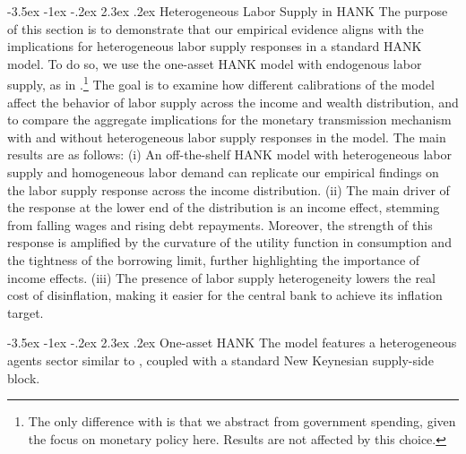 \documentclass[a4paper,12pt]{article}%
\makeatletter
\renewcommand\subsection{\@startsection {subsection}{2}{\z@}%
                  {-3.5ex \@plus -1ex \@minus -.2ex}%
                  {2.3ex \@plus.2ex}%
                  {\centering\normalsize\scshape\color{black}}}
\renewcommand\subsubsection{\@startsection {subsubsection}{3}{\z@}%
                  {-3.5ex \@plus -1ex \@minus -.2ex}%
                  {2.3ex \@plus.2ex}%
                  {\centering\normalsize \bfseries\color{black}}}
\makeatother
\begin{document}
\subsection{Heterogeneous Labor Supply in HANK}\label{T:HANK}
The purpose of this section is to demonstrate that our empirical evidence aligns with the implications for heterogeneous labor supply responses in a standard HANK model. To do so, we use the one-asset HANK model with endogenous labor supply, as in \cite{ABRS21}.\footnote{The only difference with \cite{ABRS21} is that we abstract from government spending, given the focus on monetary policy here. Results are not affected by this choice.} The goal is to examine how different calibrations of the model affect the behavior of labor supply across the income and wealth distribution, and to compare the aggregate implications for the monetary transmission mechanism with and without heterogeneous labor supply responses in the model.
The main results are as follows:
(i) An off-the-shelf HANK model with heterogeneous labor supply and homogeneous labor demand can replicate our empirical findings on the labor supply response across the income distribution.
(ii) The main driver of the response at the lower end of the distribution is an income effect, stemming from falling wages and rising debt repayments. Moreover, the strength of this response is amplified by the curvature of the utility function in consumption and the tightness of the borrowing limit, further highlighting the importance of income effects.
(iii) The presence of labor supply heterogeneity lowers the real cost of disinflation, making it easier for the central bank to achieve its inflation target.


\subsubsection{One-asset HANK}
The model features a heterogeneous agents sector similar to \cite{MNS:2016}, coupled with a standard New Keynesian supply-side block.
\end{document}
